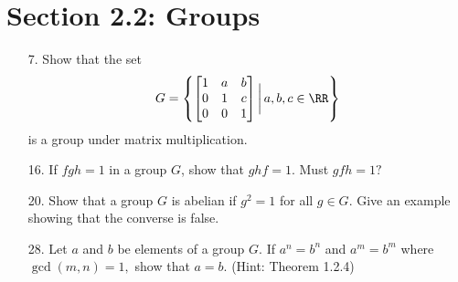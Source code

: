 \documentclass{article}
\begin{document}
\section*{Section 2.2: Groups}
\begin{itemize}
	\item[7.] Show that the set \[G=\left\{ \begin{bmatrix}
			1 & a & b \\
			0 & 1 & c \\
			0 & 0 & 1
	\end{bmatrix}\bigg\vert\, a, b, c\in\RR\right\} \] is a group under matrix multiplication.
		
	\item[16.] If $fgh=1$ in a group $G$, show that $ghf=1.$ Must $gfh=1?$

	\item[20.] Show that a group $G$ is abelian if $g^2=1$ for all $g\in G.$ Give an example showing that the converse is false.

	\item[28.] Let $a$ and $b$ be elements of a group $G.$ If $a^n=b^n$ and $a^m=b^m$ where $\gcd(m, n)=1,$ show that $a=b.$ (Hint: Theorem 1.2.4)

\end{itemize}
\end{document}
